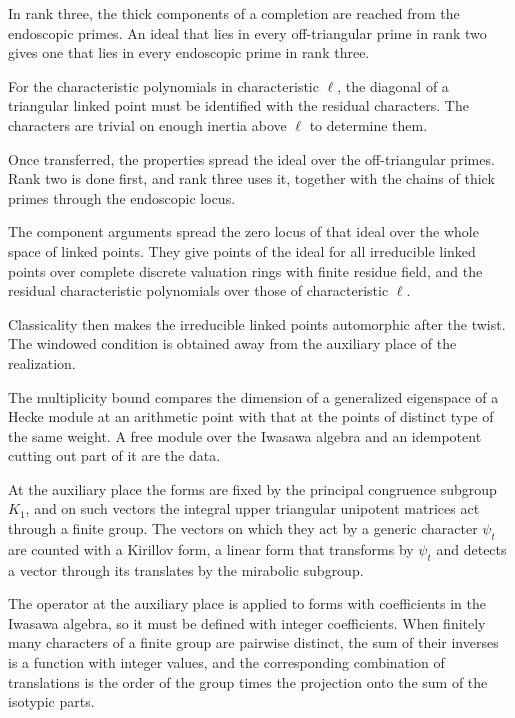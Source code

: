 In rank three, the thick components of a completion are reached from the endoscopic primes. An ideal that lies in every off-triangular prime in rank two gives one that lies in every endoscopic prime in rank three.

For the characteristic polynomials in characteristic $\ell$, the diagonal of a triangular linked point must be identified with the residual characters. The characters are trivial on enough inertia above $\ell$ to determine them.

Once transferred, the properties spread the ideal over the off-triangular primes. Rank two is done first, and rank three uses it, together with the chains of thick primes through the endoscopic locus.

The component arguments spread the zero locus of that ideal over the whole space of linked points. They give points of the ideal for all irreducible linked points over complete discrete valuation rings with finite residue field, and the residual characteristic polynomials over those of characteristic $\ell$.

Classicality then makes the irreducible linked points automorphic after the twist. The windowed condition is obtained away from the auxiliary place of the realization.

The multiplicity bound compares the dimension of a generalized eigenspace of a Hecke module at an arithmetic point with that at the points of distinct type of the same weight. A free module over the Iwasawa algebra and an idempotent cutting out part of it are the data.

At the auxiliary place the forms are fixed by the principal congruence subgroup $K_1$, and on such vectors the integral upper triangular unipotent matrices act through a finite group. The vectors on which they act by a generic character $\psi_t$ are counted with a Kirillov form, a linear form that transforms by $\psi_t$ and detects a vector through its translates by the mirabolic subgroup.

The operator at the auxiliary place is applied to forms with coefficients in the Iwasawa algebra, so it must be defined with integer coefficients. When finitely many characters of a finite group are pairwise distinct, the sum of their inverses is a function with integer values, and the corresponding combination of translations is the order of the group times the projection onto the sum of the isotypic parts.

